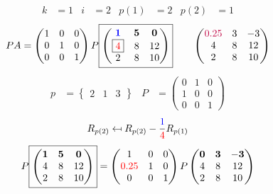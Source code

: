\documentclass[pdf]{beamer}
\begin{document}
\begin{frame}{}\begin{align*} k &= 1 & i &= 2 & p(1) &= 2 & p(2) &= 1\end{align*} $$PA=\begin{pmatrix}1&0&0\\0&1&0\\0&0&1\end{pmatrix} P \boxed{\begin{pmatrix}\mathbf{{\color{blue}1}}&\mathbf{5}&\mathbf{0}\\\boxed{{\color{red}4}}&8&12\\2&8&10\end{pmatrix}} \quad\quad \begin{pmatrix}{\color{purple}0.25}&3&-3\\4&8&12\\2&8&10\end{pmatrix}$$ \begin{align*} p&= \begin{Bmatrix}2&1&3\end{Bmatrix} & P&= \begin{pmatrix}0&1&0\\1&0&0\\0&0&1\end{pmatrix} \end{align*} $$R_{p(2)} \mapsfrom R_{p(2)} - \frac{{\color{blue}1}}{{\color{red}4}} R_{p(1)}$$ $$ P \boxed{\begin{pmatrix}\mathbf{1}&\mathbf{5}&\mathbf{0}\\4&8&12\\2&8&10\end{pmatrix}} = \begin{pmatrix}1&0&0\\{\color{red}0.25}&1&0\\0&0&1\end{pmatrix} P \begin{pmatrix}\mathbf{0}&\mathbf{3}&\mathbf{-3}\\4&8&12\\2&8&10\end{pmatrix} $$\end{frame}
\end{document}
